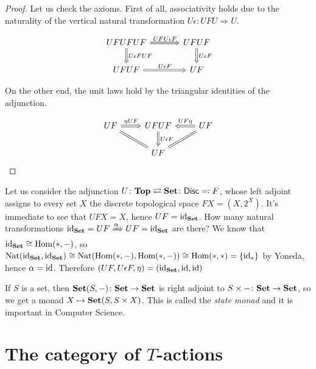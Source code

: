 \documentclass[a4paper,11pt,oneside,openany]{scrbook}
\begin{document}
\begin{proof}
	Let us check the axioms. First of all, associativity holds due to the naturality of the vertical natural transformation $U\epsilon\colon UFU\Rightarrow U$.

    \[
    \begin{tikzcd}[column sep=3.5em]
    UFUFUF\ar[r, Rightarrow, "UFU\epsilon F"]\ar[d, Rightarrow, "U\epsilon FUF"]
    & UFUF\ar[d, Rightarrow, "U\epsilon F"] \\
    UFUF\ar[r, Rightarrow, "U\epsilon F"]
    & UF
    \end{tikzcd}
    \]
    
    On the other end, the unit laws hold by the triangular identities of the adjunction.
    
    \[
    \begin{tikzcd}
    UF\ar[r, Rightarrow, "\eta UF"]\ar[dr, equal]
    & UFUF\ar[d, Rightarrow, "U\epsilon F"]
    & UF\ar[l, Rightarrow, swap, "UF\eta"]\ar[dl, Rightarrow, equal] \\
    & UF
    \end{tikzcd}
    \]
\end{proof}

\begin{exmp} Let us consider the adjunction $U\colon\mathbf{Top}\rightleftarrows{\normalfont\textbf{Set}}\colon\mathsf{Disc}\eqqcolon F$, whose left adjoint assigns to every set $X$ the discrete topological space $FX=(X, 2^X)$.
	It's immediate to see that $UFX=X$, hence $UF=\operatorname{id}_{\normalfont\textbf{Set}}$. How many natural transformations $\operatorname{id}_{\normalfont\textbf{Set}}=UF\xRightarrow{\alpha} UF=\operatorname{id}_{\normalfont\textbf{Set}}$ are there?
	We know that $\operatorname{id}_{\normalfont\textbf{Set}}\cong\operatorname{\text{Hom}}(*,-)$, so $\text{Nat}(\operatorname{id}_{\normalfont\textbf{Set}}, \operatorname{id}_{\normalfont\textbf{Set}})\cong\text{Nat}(\operatorname{\text{Hom}}(*,-),\operatorname{\text{Hom}}(*,-))\cong\operatorname{\text{Hom}}(*,*)=\{\operatorname{id}_*\}$ by Yoneda, hence $\alpha=\operatorname{id}$. Therefore $(UF,U\epsilon F, \eta)=(\operatorname{id}_{\normalfont\textbf{Set}}, \operatorname{id}, \operatorname{id})$
\end{exmp}
\begin{exmp}
	If $S$ is a set, then ${\normalfont\textbf{Set}}(S,-)\colon{\normalfont\textbf{Set}}\to{\normalfont\textbf{Set}}$ is right adjoint to $S\times-\colon{\normalfont\textbf{Set}}\to{\normalfont\textbf{Set}}$, so we get a monad $X\mapsto{\normalfont\textbf{Set}}(S,S\times X)$. This is called the \emph{state monad} and it is important in Computer Science.
\end{exmp}


\section{The category of $T$-actions}
\end{document}
